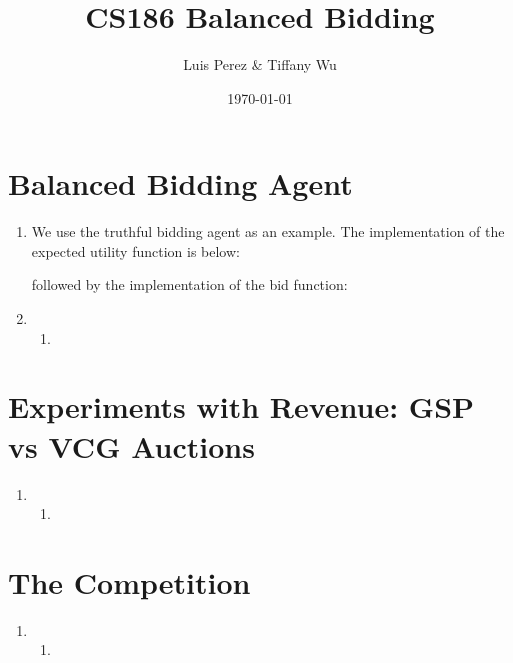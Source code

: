 \documentclass[11pt]{article}
\title{CS186 Balanced Bidding}
\author{Luis Perez \& Tiffany Wu}
\date{\today}
\begin{document}
\maketitle

\section*{Balanced Bidding Agent}
\begin{enumerate}
\item We use the truthful bidding agent as an example. The  implementation of the expected utility function is below:

  
  

  followed by the implementation of the bid function:

  
  
\item 
  \begin{enumerate}
  \item 
  \end{enumerate}
\end{enumerate}

\section*{Experiments with Revenue: GSP vs VCG Auctions}
\begin{enumerate}[resume]
\item 
  \begin{enumerate}
  \item 
  \end{enumerate}
\end{enumerate}

\section*{The Competition}
\begin{enumerate}[resume]
\item
  \begin{enumerate}
  \item 
  \end{enumerate}
\end{enumerate}
\end{document}
